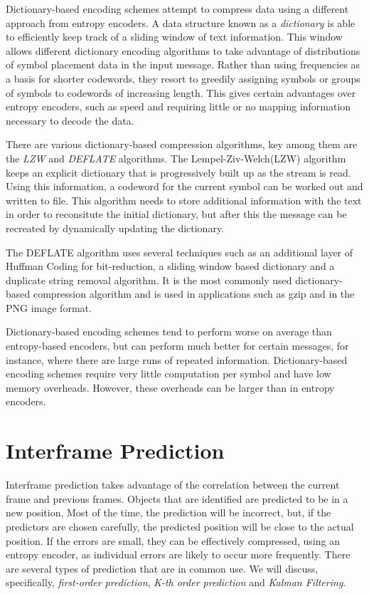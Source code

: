 \documentclass[a4paper,11pt]{report}
\begin{document}
Dictionary-based encoding schemes attempt to compress data using a different approach from entropy encoders\cite{RefWorks:2}. A data structure known as a \emph{dictionary} is able to efficiently keep track of a sliding window of text information. This window allows different dictionary encoding algorithms to take advantage of distributions of symbol placement data in the input message. Rather than using frequencies as a basis for shorter codewords, they resort to greedily assigning symbols or groups of symbols to codewords of increasing length. This gives certain advantages over entropy encoders, such as speed and requiring little or no mapping information necessary to decode the data. 

There are various dictionary-based compression algorithms, key among them are the \emph{LZW} and \emph{DEFLATE} algorithms. The Lempel-Ziv-Welch(LZW) algorithm keeps an explicit dictionary that is progressively built up as the stream is read.\cite{1320134} Using this information, a codeword for the current symbol can be worked out and written to file. This algorithm needs to store additional information with the text in order to reconsitute the initial dictionary, but after this the message can be recreated by dynamically updating the dictionary. 

The DEFLATE algorithm uses several techniques such as an additional layer of Huffman Coding for bit-reduction, a sliding window based dictionary and a duplicate string removal algorithm\cite{deflaterfc}. It is the most commonly used dictionary-based compression algorithm and is used in applications such as gzip and in the PNG image format. 

Dictionary-based encoding schemes tend to perform worse on average than entropy-based encoders, but can perform much better for certain messages, for instance, where there are large runs of repeated information. Dictionary-based encoding schemes require very little computation per symbol and have low memory overheads. However, these overheads can be larger than in entropy encoders. 

\section{Interframe Prediction} 
\label{back_inter}

Interframe prediction takes advantage of the correlation between the current frame and previous frames. Objects that are identified are predicted to be in a new position. Most of the time, the prediction will be incorrect, but, if the predictors are chosen carefully, the predicted position will be close to the actual position. If the errors are small, they can be effectively compressed, using an entropy encoder, as individual errors are likely to occur more frequently. There are several types of prediction that are in common use. We will discuss, specifically, \emph{first-order prediction}, \emph{K-th order prediction} and \emph{Kalman Filtering}.
\end{document}
